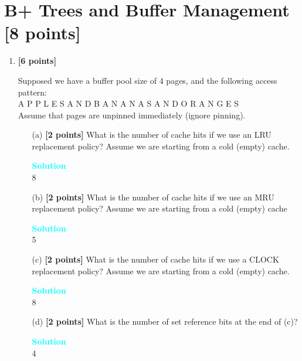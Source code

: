 \documentclass[10pt]{article}
\newenvironment{solution}
    { \begin{mdframed}[backgroundcolor=gray!10] \textcolor{cyan}{\textbf{Solution}} \\}
    {  \end{mdframed}}
\begin{document}
\section{B+ Trees and Buffer Management \textbf{[8 points]}}
\begin{enumerate}

	\item \textbf{[6 points]}
	      

	Supposed we have a buffer pool size of 4 pages, and the following access pattern: \\
	A P P L E S A N D B A N A N A S A N D O R A N G E S \\
	Assume that pages are unpinned immediately (ignore pinning).


	      \begin{itemize}
		      \item[(a)] \textbf{[2 points]} What is the number of cache hits if we
			  use an LRU replacement policy? Assume we are starting from a cold (empty) cache.
		            \begin{solution}
			            8
		            \end{solution}
		      \item[(b)] \textbf{[2 points]} What is the number of cache hits if we
			  use an MRU replacement policy? Assume we are starting from a cold (empty) cache
		            \begin{solution}
			            5
		            \end{solution}
		      \item[(c)] \textbf{[2 points]} What is the number of cache hits if we
			  use a CLOCK replacement policy? Assume we are starting from a cold (empty) cache.
		            \begin{solution}
						8
		            \end{solution}
							      \item[(d)] \textbf{[2 points]} What is the number of set reference bits
at the end of (c)?
		            \begin{solution}
						4
		            \end{solution}
	      \end{itemize}
\end{enumerate}



\newpage
\end{document}
